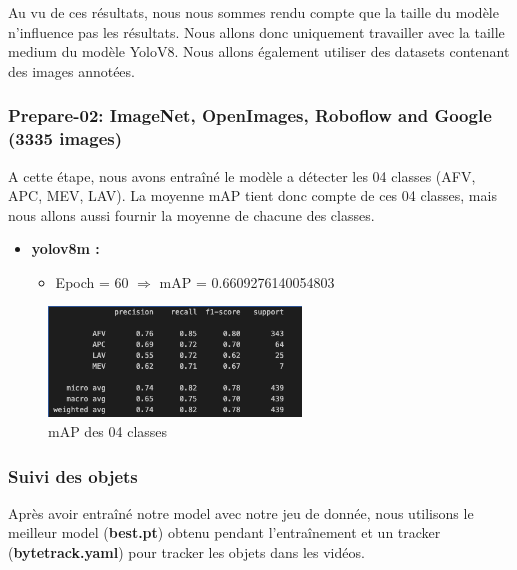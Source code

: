 Au vu de ces résultats, nous nous sommes rendu compte que la taille du modèle n'influence pas les résultats. Nous allons donc uniquement travailler avec la taille medium du modèle YoloV8.
Nous allons également utiliser des datasets contenant des images annotées.


\subsubsection*{Prepare-02: ImageNet, OpenImages, Roboflow and Google  (3335 images)}

A cette étape, nous avons entraîné le modèle a détecter les 04 classes (AFV, APC, MEV, LAV).
La moyenne mAP tient donc compte de ces 04 classes, mais nous allons aussi fournir la moyenne de chacune des classes.

\begin{itemize}
	\item \textbf{yolov8m :}
	      \begin{itemize}
		      \item Epoch = 60 $\Rightarrow$ mAP = 0.6609276140054803
	      \end{itemize}
\end{itemize}

\begin{figure}[h]
	\center
	\includegraphics[width=0.6\textwidth]{./images/map-train.png}
	\caption[mAP des 04 classes]{mAP des 04 classes}\label{fig:map-train}
\end{figure}



\subsubsection{Suivi des objets}

Après avoir entraîné notre model avec notre jeu de donnée, nous utilisons le meilleur model (\textbf{best.pt}) obtenu pendant l'entraînement et un tracker (\textbf{bytetrack.yaml}) pour tracker les objets dans les vidéos.


